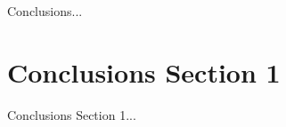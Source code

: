 \label{sec:5}

Conclusions...

\section{Conclusions Section 1}
\label{sec:5.1}

Conclusions Section 1... 
